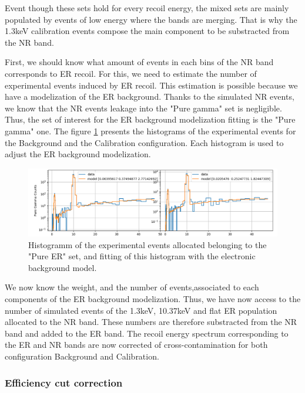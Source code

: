Event though these sets hold for every recoil energy, the mixed sets are mainly populated by events of low energy where the bands are merging. That is why the 1.3keV calibration events compose the main component to be substracted from the NR band.

First, we should know what amount of events in each bins of the NR band corresponds to ER recoil. For this, we need to estimate the number of experimental events induced by ER recoil. This estimation is possible because we have a modelization of the ER background. Thanks to the simulated NR events, we know that the NR events leakage into the "Pure gamma" set is negligible. Thus, the set of interest for the ER background modelization fitting is the "Pure gamma" one. The figure \ref{fig:er-components-fitting} presents the histograms of the experimental events for the Background and the Calibration configuration. Each histogram is used to adjust the ER background modelization. 

\begin{figure}
\centering
\includegraphics[width=\linewidth,]{Figures/Neutron/er_components_fitting.png}
\caption{Histogramm of the experimental events allocated belonging to the "Pure ER" set, and fitting of this histogram with the electronic background model.}
\label{fig:er-components-fitting}
\end{figure}

We now know the weight, and the number of events,associated to each components of the ER background modelization. Thus, we have now access to the number of simulated events of the 1.3keV, 10.37keV and flat ER population allocated to the NR band. These numbers are therefore substracted from the NR band and added to the ER band. The recoil energy spectrum corresponding to the ER and NR bands are now corrected of cross-contamination for both configuration Background and Calibration.


\subsubsection{Efficiency cut correction}
\label{par:efficiency}

